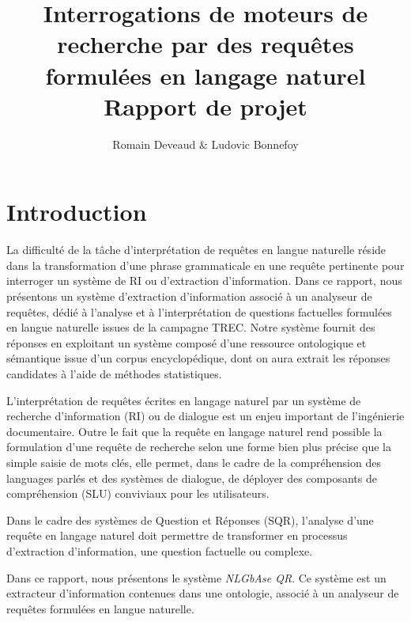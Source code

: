 \documentclass[10pt,a4paper]{article}
\title{\Large\bf Interrogations de moteurs de recherche par des requêtes formulées en langage naturel \\ 
  Rapport de projet}
\author{Romain Deveaud \& Ludovic Bonnefoy}
\begin{document}
\parindent=0pt

\maketitle
\newpage
\newpage
\tableofcontents
\newpage

\section{Introduction}
\par La difficulté de la tâche d'interprétation de requêtes en langue naturelle réside dans la transformation d'une phrase grammaticale en une requête pertinente pour interroger un système de RI ou d'extraction d'information. Dans ce rapport, nous présentons un système d'extraction d'information associé à un analyseur de requêtes, dédié à l'analyse et à l'interprétation de questions factuelles formulées en langue naturelle issues de la campagne TREC. Notre système fournit des réponses en exploitant un système composé d'une ressource ontologique et sémantique issue d'un corpus encyclopédique, dont on aura extrait les réponses candidates à l'aide de méthodes statistiques.
\par L'interprétation de requêtes écrites en langage naturel par un système de recherche d'information (RI) ou de dialogue est un enjeu important de l'ingénierie documentaire. Outre le fait que la requête en langage naturel rend possible la formulation d'une requête de recherche selon une forme bien plus précise que la simple saisie de mots clés, elle permet, dans le cadre de la compréhension des languages parlés et des systèmes de dialogue, de déployer des composants de compréhension (SLU) conviviaux pour les utilisateurs. 

\par Dans le cadre des systèmes de Question et Réponses (SQR), l'analyse d'une requête en langage naturel doit permettre de transformer en processus d'extraction d'information, une question factuelle ou complexe. 

\par Dans ce rapport, nous présentons le système \textit{NLGbAse QR}. Ce système est un extracteur d'information contenues dans une ontologie, associé à un analyseur de requêtes formulées en langue naturelle. 
\end{document}
